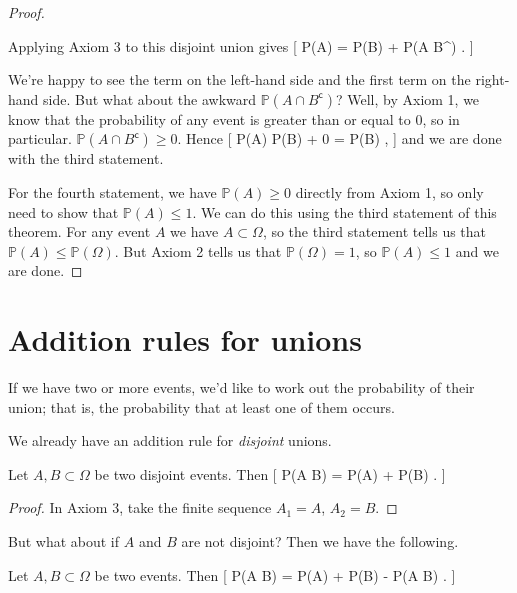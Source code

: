 \documentclass[
  letterpaper,
]{report}
\theoremstyle{definition}
\theoremstyle{definition}
\theoremstyle{remark}
\begin{document}
\begin{proof}
\begin{figure}
{}

\end{figure}

Applying Axiom 3 to this disjoint union gives {[} \mathbb P(A) =
\mathbb P(B) + \mathbb P(A \cap B\^{}) . {]}

We're happy to see the term on the left-hand side and the first term on
the right-hand side. But what about the awkward
\(\mathbb P(A \cap B^\mathsf{c})\)? Well, by Axiom 1, we know that the
probability of any event is greater than or equal to 0, so in
particular. \(\mathbb P(A \cap B^\mathsf{c}) \geq 0\). Hence {[}
\mathbb P(A) \geq \mathbb P(B) + 0 = \mathbb P(B) , {]} and we are done
with the third statement.

For the fourth statement, we have \(\mathbb P(A) \geq 0\) directly from
Axiom 1, so only need to show that \(\mathbb P(A) \leq 1\). We can do
this using the third statement of this theorem. For any event \(A\) we
have \(A \subset \Omega\), so the third statement tells us that
\(\mathbb P(A) \leq \mathbb P(\Omega)\). But Axiom 2 tells us that
\(\mathbb P(\Omega) = 1\), so \(\mathbb P(A) \leq 1\) and we are done.

\end{proof}

\hypertarget{addition}{%
\section{Addition rules for unions}\label{addition}}

If we have two or more events, we'd like to work out the probability of
their union; that is, the probability that at least one of them occurs.

We already have an addition rule for \emph{disjoint} unions.

Let \(A, B \subset \Omega\) be two disjoint events. Then {[} \mathbb P(A
\cup B) = \mathbb P(A) + \mathbb P(B) . {]}

\begin{proof}

In Axiom 3, take the finite sequence \(A_1 = A\), \(A_2 = B\).

\end{proof}

But what about if \(A\) and \(B\) are not disjoint? Then we have the
following.

Let \(A, B \subset \Omega\) be two events. Then {[} \mathbb P(A \cup B)
= \mathbb P(A) + \mathbb P(B) - \mathbb P(A \cap B) . {]}
\end{document}
